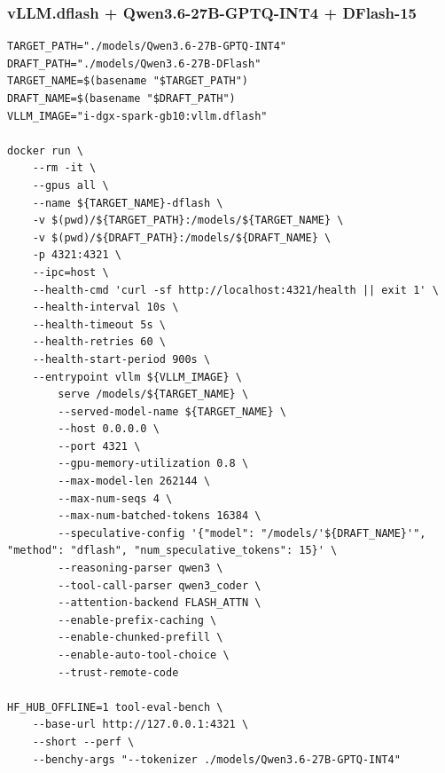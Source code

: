 \documentclass{article}
\begin{document}
\subsubsection{vLLM.dflash + Qwen3.6-27B-GPTQ-INT4 + DFlash-15}
\begin{lstlisting}
TARGET_PATH="./models/Qwen3.6-27B-GPTQ-INT4"
DRAFT_PATH="./models/Qwen3.6-27B-DFlash"
TARGET_NAME=$(basename "$TARGET_PATH")
DRAFT_NAME=$(basename "$DRAFT_PATH")
VLLM_IMAGE="i-dgx-spark-gb10:vllm.dflash"

docker run \
    --rm -it \
    --gpus all \
    --name ${TARGET_NAME}-dflash \
    -v $(pwd)/${TARGET_PATH}:/models/${TARGET_NAME} \
    -v $(pwd)/${DRAFT_PATH}:/models/${DRAFT_NAME} \
    -p 4321:4321 \
    --ipc=host \
    --health-cmd 'curl -sf http://localhost:4321/health || exit 1' \
    --health-interval 10s \
    --health-timeout 5s \
    --health-retries 60 \
    --health-start-period 900s \
    --entrypoint vllm ${VLLM_IMAGE} \
        serve /models/${TARGET_NAME} \
        --served-model-name ${TARGET_NAME} \
        --host 0.0.0.0 \
        --port 4321 \
        --gpu-memory-utilization 0.8 \
        --max-model-len 262144 \
        --max-num-seqs 4 \
        --max-num-batched-tokens 16384 \
        --speculative-config '{"model": "/models/'${DRAFT_NAME}'", "method": "dflash", "num_speculative_tokens": 15}' \
        --reasoning-parser qwen3 \
        --tool-call-parser qwen3_coder \
        --attention-backend FLASH_ATTN \
        --enable-prefix-caching \
        --enable-chunked-prefill \
        --enable-auto-tool-choice \
        --trust-remote-code

HF_HUB_OFFLINE=1 tool-eval-bench \
    --base-url http://127.0.0.1:4321 \
    --short --perf \
    --benchy-args "--tokenizer ./models/Qwen3.6-27B-GPTQ-INT4"
\end{lstlisting}
\end{document}
